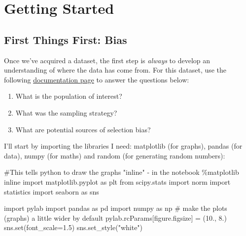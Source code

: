 \documentclass[
  letterpaper,
  DIV=11,
  numbers=noendperiod]{scrreprt}
\newenvironment{Shaded}{\begin{snugshade}}{\end{snugshade}}
\newcommand{\BuiltInTok}[1]{\textcolor[rgb]{0.00,0.23,0.31}{#1}}
\newcommand{\CommentTok}[1]{\textcolor[rgb]{0.37,0.37,0.37}{#1}}
\newcommand{\FloatTok}[1]{\textcolor[rgb]{0.68,0.00,0.00}{#1}}
\newcommand{\ImportTok}[1]{\textcolor[rgb]{0.00,0.46,0.62}{#1}}
\newcommand{\NormalTok}[1]{\textcolor[rgb]{0.00,0.23,0.31}{#1}}
\newcommand{\OperatorTok}[1]{\textcolor[rgb]{0.37,0.37,0.37}{#1}}
\newcommand{\StringTok}[1]{\textcolor[rgb]{0.13,0.47,0.30}{#1}}
\providecommand{\tightlist}{%
  \setlength{\itemsep}{0pt}\setlength{\parskip}{0pt}}\usepackage{longtable,booktabs,array}
\begin{document}
\hypertarget{getting-started-1}{%
\section{Getting Started}\label{getting-started-1}}

\hypertarget{first-things-first-bias}{%
\subsection{First Things First: Bias}\label{first-things-first-bias}}

Once we've acquired a dataset, the first step is \emph{always} to
develop an understanding of where the data has come from. For this
dataset, use the following
\href{https://www.census.gov/programs-surveys/cps/technical-documentation/methodology.html}{documentation
page} to answer the questions below:

\begin{enumerate}
\def\labelenumi{\arabic{enumi})}
\tightlist
\item
  What is the population of interest?
\item
  What was the sampling strategy?
\item
  What are potential sources of selection bias?
\end{enumerate}

I'll start by importing the libraries I need: matplotlib (for graphs),
pandas (for data), numpy (for maths) and random (for generating random
numbers):

\begin{Shaded}
\begin{Highlighting}[]
\CommentTok{\#This tells python to draw the graphs "inline" {-} in the notebook}
\OperatorTok{\%}\NormalTok{matplotlib inline  }
\ImportTok{import}\NormalTok{ matplotlib.pyplot }\ImportTok{as}\NormalTok{ plt}
\ImportTok{from}\NormalTok{ scipy.stats }\ImportTok{import}\NormalTok{ norm}
\ImportTok{import}\NormalTok{ statistics}
\ImportTok{import}\NormalTok{ seaborn }\ImportTok{as}\NormalTok{ sns}

\ImportTok{import}\NormalTok{ pylab}
\ImportTok{import}\NormalTok{ pandas }\ImportTok{as}\NormalTok{ pd}
\ImportTok{import}\NormalTok{ numpy }\ImportTok{as}\NormalTok{ np}
\CommentTok{\# make the plots (graphs) a little wider by default}
\NormalTok{pylab.rcParams[}\StringTok{\textquotesingle{}figure.figsize\textquotesingle{}}\NormalTok{] }\OperatorTok{=}\NormalTok{ (}\FloatTok{10.}\NormalTok{, }\FloatTok{8.}\NormalTok{)}
\NormalTok{sns.}\BuiltInTok{set}\NormalTok{(font\_scale}\OperatorTok{=}\FloatTok{1.5}\NormalTok{)}
\NormalTok{sns.set\_style(}\StringTok{"white"}\NormalTok{)}
\end{Highlighting}
\end{Shaded}
\end{document}
